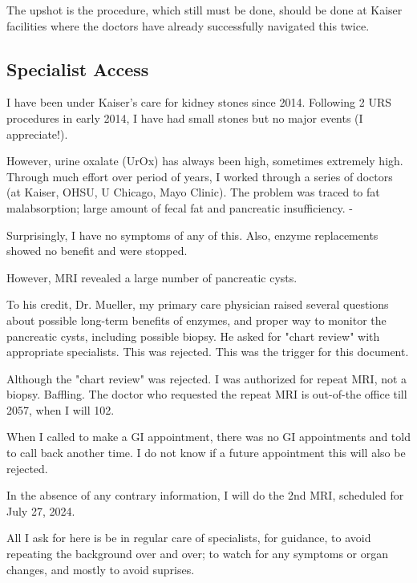 \documentclass[11pt]{article}
\begin{document}
The upshot is the procedure, which still must be done, should be done
at Kaiser facilities where the doctors have already successfully
navigated this twice.



\subsection{Specialist Access}
\label{sec:org297b1e3}

I have been under Kaiser's care for kidney stones since 2014.
Following 2 URS procedures in early 2014, I have had small stones but no
major events (I appreciate!).

However, urine oxalate (UrOx) has always been high, sometimes extremely
high.  Through much effort over period of years, I worked through a
series of doctors (at Kaiser, OHSU, U Chicago, Mayo Clinic).  The
problem was traced to fat malabsorption; large amount of fecal fat and
pancreatic insufficiency. -

Surprisingly, I have no symptoms of any of this.  
Also, enzyme replacements showed no benefit and were stopped.

However, MRI revealed a large number of pancreatic cysts.

To his credit, Dr. Mueller, my primary care physician raised several
questions about possible long-term benefits of enzymes, and proper way
to monitor the pancreatic cysts, including possible biopsy.  He
asked for "chart review" with appropriate specialists.  This was
rejected.  This was the trigger for this document.

Although the "chart review" was rejected. I was authorized for repeat
MRI, not a biopsy.  Baffling.  The doctor who requested the repeat MRI
is out-of-the office till 2057, when I will 102.

When I called to make a GI appointment, there was no GI appointments
and told to call back another time.  I do not know if a future
appointment this will also be rejected.

In the absence of any contrary information, I will do the 2nd MRI,
scheduled for July 27, 2024.

All I ask for here is be in regular care of specialists, for guidance,
to avoid repeating the background over and over; to watch for any symptoms or
organ changes, and mostly to avoid suprises.
\end{document}
